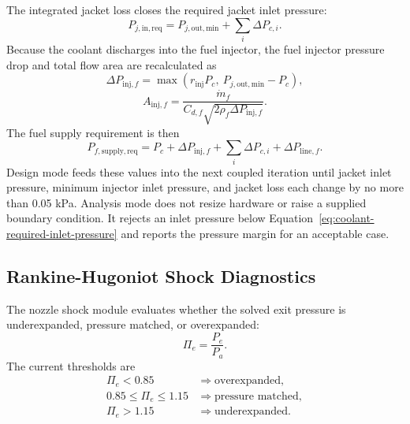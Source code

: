 \documentclass[11pt]{article}
\newcommand{\mdot}{\dot{m}}
\begin{document}
The integrated jacket loss closes the required jacket inlet pressure:
\begin{equation}
P_{j,\mathrm{in,req}}=P_{j,\mathrm{out,min}}+\sum_i\Delta P_{c,i}.
\label{eq:coolant-required-inlet-pressure}
\end{equation}
Because the coolant discharges into the fuel injector, the fuel injector pressure drop and total flow area are recalculated as
\begin{equation}
\Delta P_{\mathrm{inj},f}=\max\left(r_{\mathrm{inj}}P_c,\ P_{j,\mathrm{out,min}}-P_c\right),
\label{eq:coolant-coupled-injector-drop}
\end{equation}
\begin{equation}
A_{\mathrm{inj},f}=\frac{\mdot_f}{C_{d,f}\sqrt{2\rho_f\Delta P_{\mathrm{inj},f}}}.
\label{eq:coolant-coupled-injector-area}
\end{equation}
The fuel supply requirement is then
\begin{equation}
P_{f,\mathrm{supply,req}}=P_c+\Delta P_{\mathrm{inj},f}+\sum_i\Delta P_{c,i}+\Delta P_{\mathrm{line},f}.
\label{eq:coolant-coupled-fuel-supply}
\end{equation}
Design mode feeds these values into the next coupled iteration until jacket inlet pressure, minimum injector inlet pressure, and jacket loss each change by no more than 0.05 kPa. Analysis mode does not resize hardware or raise a supplied boundary condition. It rejects an inlet pressure below Equation~\ref{eq:coolant-required-inlet-pressure} and reports the pressure margin for an acceptable case.

\subsection{Rankine-Hugoniot Shock Diagnostics}
The nozzle shock module evaluates whether the solved exit pressure is underexpanded, pressure matched, or overexpanded:
\begin{equation}
\Pi_e=\frac{P_e}{P_a}.
\label{eq:exit-ambient-ratio}
\end{equation}
The current thresholds are
\begin{equation}
\begin{aligned}
\Pi_e<0.85 &\Rightarrow \text{overexpanded},\\
0.85\le\Pi_e\le1.15 &\Rightarrow \text{pressure matched},\\
\Pi_e>1.15 &\Rightarrow \text{underexpanded}.
\end{aligned}
\label{eq:expansion-regime}
\end{equation}
\end{document}
